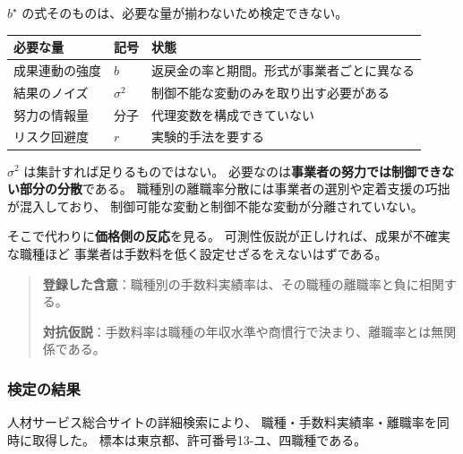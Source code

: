$b^\star$ の式そのものは、必要な量が揃わないため検定できない。

\begin{center}
\begin{tabularx}{\textwidth}{@{}llX@{}}
\toprule
必要な量 & 記号 & 状態 \\
\midrule
成果連動の強度 & $b$ & 返戻金の率と期間。形式が事業者ごとに異なる \\
結果のノイズ & $\sigma^2$ & 制御不能な変動のみを取り出す必要がある \\
努力の情報量 & 分子 & 代理変数を構成できていない \\
リスク回避度 & $r$ & 実験的手法を要する \\
\bottomrule
\end{tabularx}
\label{tab:bstar-requirements}
\end{center}

$\sigma^2$ は集計すれば足りるものではない。
必要なのは\textbf{事業者の努力では制御できない部分の分散}である。
職種別の離職率分散には事業者の選別や定着支援の巧拙が混入しており、
制御可能な変動と制御不能な変動が分離されていない。

そこで代わりに\textbf{価格側の反応}を見る。
可測性仮説が正しければ、成果が不確実な職種ほど
事業者は手数料を低く設定せざるをえないはずである。

\begin{quote}
\textbf{登録した含意}：職種別の手数料実績率は、その職種の離職率と負に相関する。

\textbf{対抗仮説}：手数料率は職種の年収水準や商慣行で決まり、離職率とは無関係である。
\end{quote}

\subsubsection{検定の結果}
\label{sec:predX-result}

人材サービス総合サイトの詳細検索により、
職種・手数料実績率・離職率を同時に取得した。
標本は東京都、許可番号13-ユ、四職種である。

